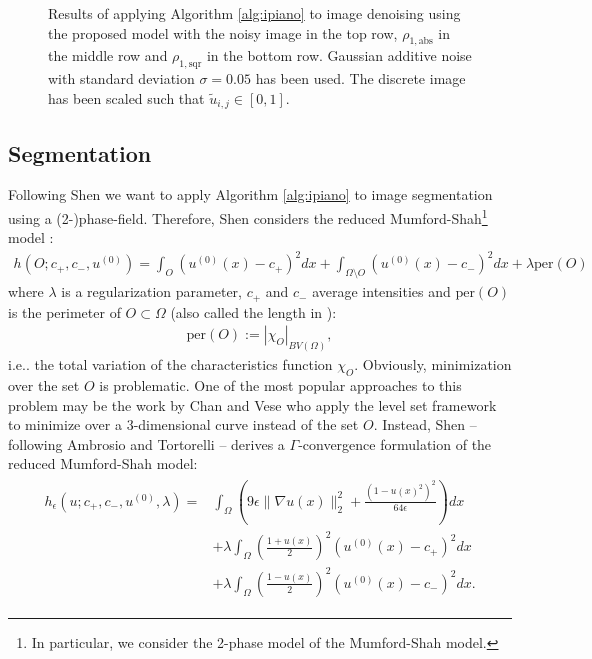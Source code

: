 \documentclass[onecolumn,final,a4paper,13pt,reqno]{siamart}
\makeatletter
\DeclareRobustCommand\onedot{\futurelet\@let@token\@onedot}
\def\@onedot{\ifx\@let@token.\else.\null\fi\xspace}
\def\ie{{i.e}\onedot} \def\Ie{{I.e}\onedot}
\def\per{\text{per}}
\makeatother
\begin{document}
\begin{figure}[h]
\begin{subfigure}[t]{0.19\textwidth}
	\end{subfigure}
	\caption{Results of applying Algorithm \ref{alg:ipiano} to image denoising using the proposed model with the noisy image in the top row, $\rho_{1,\text{abs}}$ in the middle row and $\rho_{1,\text{sqr}}$ in the bottom row. Gaussian additive noise with standard deviation $\sigma = 0.05$ has been used. The discrete image has been scaled such that $\tilde{u}_{i,j} \in [0,1]$.}
	\label{fig:image-denoising}
\end{figure}

\subsection{Segmentation}

Following Shen \cite{Shen:2005} we want to apply Algorithm \ref{alg:ipiano} to image segmentation using a (2-)phase-field. Therefore, Shen considers the reduced Mumford-Shah\footnote{
	In particular, we consider the 2-phase model of the Mumford-Shah model.
} model \cite{MumfordShah:1989}:
\begin{align}
	h(O; c_+, c_-, u^{(0)}) = \int_{O} (u^{(0)}(x) - c_+)^2 dx + \int_{\Omega\setminus O} (u^{(0)}(x) - c_-)^2 dx + \lambda \per(O)
\end{align}
where $\lambda$ is a regularization parameter, $c_+$ and $c_-$ average intensities and $\per(O)$ is the perimeter of $O \subset \Omega$ (also called the length in \cite{Shen:2005}):
\begin{align}
	\per(O) := |\chi_O|_{BV(\Omega)},
\end{align}
\ie the total variation of the characteristics function $\chi_O$. Obviously, minimization over the set $O$ is problematic. One of the most popular approaches to this problem may be the work by Chan and Vese \cite{ChanVese:2002} who apply the level set framework to minimize over a $3$-dimensional curve instead of the set $O$. Instead, Shen -- following Ambrosio and Tortorelli \cite{AmbrosioTortorelli:1990} -- derives a $\Gamma$-convergence formulation of the reduced Mumford-Shah model:
\begin{align}
	\begin{aligned}
		h_\epsilon(u; c_+, c_-, u^{(0)}, \lambda) =& \int_{\Omega} \left(9 \epsilon \|\nabla u(x)\|_2^2 + \frac{(1 - u(x)^2)^2}{64 \epsilon}\right) dx\\
		& + \lambda \int_{\Omega}\left(\frac{1 + u(x)}{2}\right)^2(u^{(0)}(x) - c_+)^2 dx\\
		& + \lambda \int_{\Omega} \left(\frac{1 - u(x)}{2}\right)^2 (u^{(0)}(x) - c_-)^2 dx.
	\end{aligned}\label{eq:phase-field-h}
\end{align}
\end{document}
